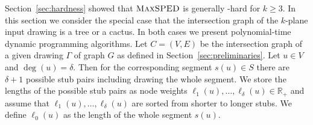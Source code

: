 \documentclass[a4paper,english,numberwithinsect]{eurocg18}
\newcommand{\martin}[1]{\todo[inline,color=blue!40]{MN: #1}}
\newcommand{\fabian}[1]{\todo[inline,color=pink!40]{FK: #1}}
\newcommand{\maxsped}{\ensuremath{\textsc{MaxSPED}}\xspace}
\begin{document}
Section~\ref{sec:hardness} showed that \maxsped is generally \NP-hard for $k \ge 3$. In this section we consider the special case that the intersection graph of the $k$-plane input drawing is a tree or a cactus. In both cases we present polynomial-time dynamic programming algorithms. Let $ C = (V,E) $ be the intersection graph of a given drawing $\Gamma$ of graph $ G $ as defined in Section~\ref{sec:preliminaries}. Let $ u \in V $ and $ \deg(u) = \delta $. 
Then for the corresponding segment $ s(u) \in S $ there are $ \delta + 1 $ possible stub pairs including drawing the whole segment. We store the lengths of the possible stub pairs as node weights $ \ell_1(u), \dots, \ell_\delta(u) \in \mathbb{R}_+$ and assume that $ \ell_1(u),\dots,\ell_\delta(u) $ are sorted from shorter to longer stubs. We define  $ \ell_0(u) $ as the length of the whole segment $ s(u) $. 

%
\end{document}

